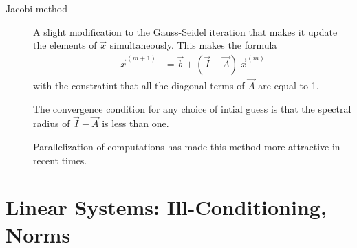 \begin{description}
    \item[Jacobi method] A slight modification to the Gauss-Seidel iteration that makes
        it update the elements of $ \vec{x} $ simultaneously. This makes the formula
        \begin{align}
            \vec{x}^{(m+1)} & = \vec{b} + (\vec{I} - \vec{A})\ \vec{x}^{(m)}
        \end{align}
        with the constratint that all the diagonal terms of $ \vec{A} $ are equal to 1.
        \par
        The convergence condition for any choice of intial guess is that the spectral
        radius of $ \vec{I} - \vec{A} $ is less than one. \par
        Parallelization of computations has made this method more attractive in recent
        times.

\end{description}

\section{Linear Systems: Ill-Conditioning, Norms}

